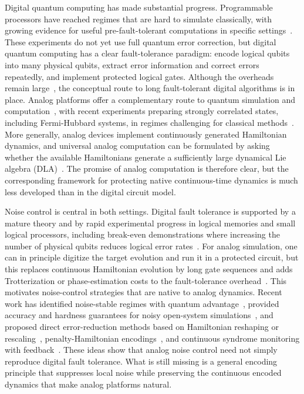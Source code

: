 \documentclass[10pt,twocolumn,superscriptaddress,aps,amsmath,amssymb,citeautoscript,floatfix,prx]{revtex4-2}
\newcounter{alg}
\theoremstyle{plain}
\theoremstyle{plain}
\theoremstyle{plain}
\theoremstyle{plain}
\theoremstyle{plain}
\theoremstyle{plain}
\theoremstyle{plain}
\theoremstyle{definition}
\theoremstyle{plain}
\begin{document}
Digital quantum computing has made substantial progress. Programmable processors have reached regimes that are hard to simulate classically, 
with growing evidence for useful pre-fault-tolerant computations in specific settings~\cite{Arute2019,Kim2023}. 
These experiments do not yet use full quantum error correction, but digital quantum computing has a clear fault-tolerance paradigm: 
encode logical qubits into many physical qubits, extract error information and correct errors repeatedly, and implement protected logical gates. 
Although the overheads remain large~\cite{Fowler2019, Gidney2021}, the conceptual route to long fault-tolerant digital algorithms is in place. 
Analog platforms offer a complementary route to quantum simulation and computation~\cite{Bloch2012,Browaeys2020,Daley2022,Schaefer2020}, with recent experiments preparing strongly correlated states, 
including Fermi-Hubbard systems, in regimes challenging for classical methods~\cite{Xu2025,Mazurenko2017,Shao2024,Chalopin2024}.
 More generally, analog devices implement continuously generated Hamiltonian dynamics, and universal analog computation can be formulated by asking whether the available Hamiltonians generate a 
 sufficiently large dynamical Lie algebra (DLA)~\cite{Tavis1968,DAlessandro2021,Chen2020,Albertini2018,Albertini2020,Wang2016,Wang2012,Zanardi2004,AlbertiniDAlessandro2025,Hu2025}. 
 The promise of analog computation is therefore clear, but the corresponding framework for protecting native continuous-time dynamics is much less developed than in the digital circuit model.

Noise control is central in both settings. Digital fault tolerance is supported by a mature theory and by rapid experimental progress in logical memories and small logical processors, including break-even demonstrations where increasing the number of physical qubits reduces 
logical error rates~\cite{Krinner2022,AcharyaGoogle2025,RyanAnderson2021,daSilvaPaetznick2024,Reichardt2024Tesseract,Bluvstein2024,Reichardt2024NeutralAtom}. 
For analog simulation, one can in principle digitize the target evolution and run it in a protected circuit, but this replaces continuous Hamiltonian evolution by long gate sequences and adds Trotterization
 or phase-estimation costs to the fault-tolerance overhead~\cite{Reiher2017ReactionMechanisms,Kivlichan2020Trotter}. 
 This motivates noise-control strategies that are native to analog dynamics. Recent work has identified noise-stable regimes with quantum advantage~\cite{Trivedi2024AnalogStability}, 
 provided accuracy and hardness guarantees for noisy open-system simulations~\cite{Kashyap2025AnalogOpenSimulation}, and proposed direct error-reduction methods based on Hamiltonian 
 reshaping or rescaling~\cite{Guo2025HamiltonianReshaping}, penalty-Hamiltonian encodings~\cite{Cao2024RobustAnalog}, and continuous syndrome monitoring with feedback~\cite{Atalaya2021ContinuousQEC}. 
 These ideas show that analog noise control need not simply reproduce digital fault tolerance. 
 What is still missing is a general encoding principle that suppresses local noise while preserving the continuous encoded dynamics that make analog platforms natural.
\end{document}
